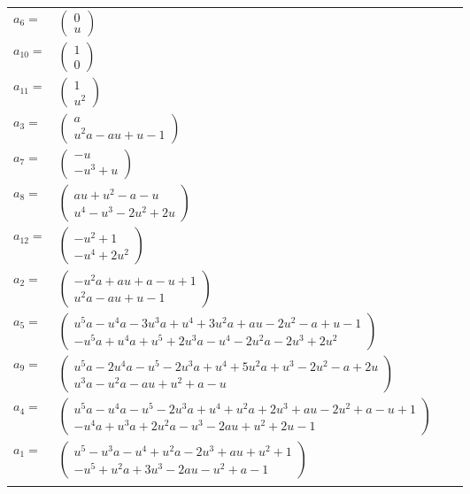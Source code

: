 \documentclass[1p]{elsarticle_modified}
\theoremstyle{definition}
\begin{document}
\begin{tabular}{m{7pt} m{180pt} m{7pt} m{180pt} }
\flushright $a_{6}=$&$\begin{pmatrix}0\\u\end{pmatrix}$ \\
\flushright $a_{10}=$&$\begin{pmatrix}1\\0\end{pmatrix}$ \\
\flushright $a_{11}=$&$\begin{pmatrix}1\\u^2\end{pmatrix}$ \\
\flushright $a_{3}=$&$\begin{pmatrix}a\\u^2 a- a u+u-1\end{pmatrix}$ \\
\flushright $a_{7}=$&$\begin{pmatrix}- u\\- u^3+u\end{pmatrix}$ \\
\flushright $a_{8}=$&$\begin{pmatrix}a u+u^2- a- u\\u^4- u^3-2 u^2+2 u\end{pmatrix}$ \\
\flushright $a_{12}=$&$\begin{pmatrix}- u^2+1\\- u^4+2 u^2\end{pmatrix}$ \\
\flushright $a_{2}=$&$\begin{pmatrix}- u^2 a+a u+a- u+1\\u^2 a- a u+u-1\end{pmatrix}$ \\
\flushright $a_{5}=$&$\begin{pmatrix}u^5 a- u^4 a-3 u^3 a+u^4+3 u^2 a+a u-2 u^2- a+u-1\\- u^5 a+u^4 a+u^5+2 u^3 a- u^4-2 u^2 a-2 u^3+2 u^2\end{pmatrix}$ \\
\flushright $a_{9}=$&$\begin{pmatrix}u^5 a-2 u^4 a- u^5-2 u^3 a+u^4+5 u^2 a+u^3-2 u^2- a+2 u\\u^3 a- u^2 a- a u+u^2+a- u\end{pmatrix}$ \\
\flushright $a_{4}=$&$\begin{pmatrix}u^5 a- u^4 a- u^5-2 u^3 a+u^4+u^2 a+2 u^3+a u-2 u^2+a- u+1\\- u^4 a+u^3 a+2 u^2 a- u^3-2 a u+u^2+2 u-1\end{pmatrix}$ \\
\flushright $a_{1}=$&$\begin{pmatrix}u^5- u^3 a- u^4+u^2 a-2 u^3+a u+u^2+1\\- u^5+u^2 a+3 u^3-2 a u- u^2+a-1\end{pmatrix}$\\&\end{tabular}
\end{document}
